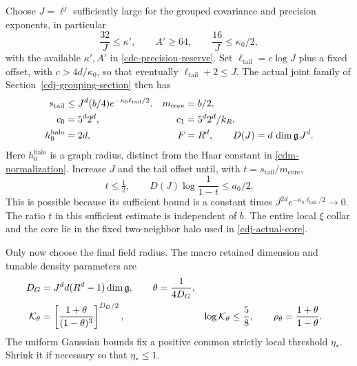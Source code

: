 \documentclass[11pt]{article}
\theoremstyle{remark}
\begin{document}
Choose $J=\ell^j$ sufficiently large for the grouped covariance
and precision exponents, in particular
\begin{equation}
 \frac{32}{J}\le\kappa',\qquad A'\ge64,\qquad
 \frac{16}{J}\le\kappa_0/2,
 \label{cdm-J-choice}
\end{equation}
with the available $\kappa',A'$ in
\eqref{cdc-precision-reserve}. Set
$\ell_{\mathrm{tail}}=c\log J$ plus a fixed offset, with
$c>4d/\kappa_0$, so that eventually
$\ell_{\mathrm{tail}}+2\le J$. The actual joint family of
Section~\ref{cdj-grouping-section} then has
\begin{align}
 s_{\mathrm{tail}}
 &\le J^d(b/4)e^{-\kappa_0\ell_{\mathrm{tail}}/2},
 &m_{\mathrm{core}}&=b/2,\notag\\
 c_0&=5^d2^d,&c_1&=5^d2^d/k_R,\notag\\
 h_0^{\mathrm{halo}}&=2d,&F&=R^d,\qquad
 D(J)=d\,\dim\mathfrak g\,J^d .
 \label{cdm-tail-data}
\end{align}
Here $h_0^{\mathrm{halo}}$ is a graph radius, distinct from the
Haar constant in \eqref{cdm-normalization}. Increase $J$ and
the tail offset until, with $t=s_{\mathrm{tail}}/m_{\mathrm{core}}$,
\begin{equation}
 t\le\tfrac12,\qquad D(J)\log\frac1{1-t}\le a_0/2.
 \label{cdm-tail-budget}
\end{equation}
This is possible because its sufficient bound is a constant
times $J^{2d}e^{-\kappa_0\ell_{\mathrm{tail}}/2}\to0$.
The ratio $t$ in this sufficient estimate is independent of $b$.
The entire local $\xi$ collar and the core lie in the fixed
two-neighbor halo used in \eqref{cdj-actual-core}.

Only now choose the final field radius. The macro retained
dimension and tunable density parameters are
\begin{align}
 D_G&=J^d d(R^d-1)\dim\mathfrak g,\qquad
 \theta=\frac1{4D_G},\notag\\
 \mathcal K_\theta
 &=\left[\frac{1+\theta}{(1-\theta)^3}\right]^{D_G/2},
 &\log\mathcal K_\theta&\le\frac58,\qquad
 \rho_\theta=\frac{1+\theta}{1-\theta}.
 \label{cdm-density-parameters}
\end{align}
The uniform Gaussian bounds fix a positive common strictly
local threshold $\eta_*$. Shrink it if necessary so that
$\eta_*\le1$.
\end{document}
